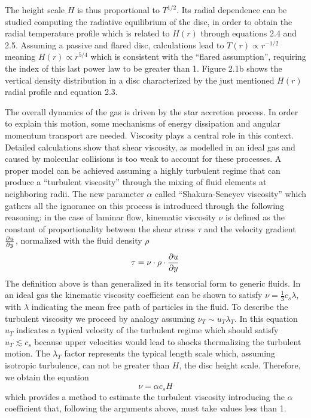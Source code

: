 \documentclass[a4paper,10pt]{report}
\begin{document}
The height scale $H$ is thus proportional to $T^{1/2}$. Its radial dependence
can be studied computing the radiative equilibrium of the disc, in order to obtain the 
radial temperature profile which is related to $H(r)$ through equations 2.4 and 2.5.
Assuming a passive and flared disc, calculations lead to $T(r) \propto r^{-1/2}$ 
meaning $H(r) \propto r^{5/4}$ which is consistent with the ``flared assumption'', requiring the index of this last
power law to be greater than 1.
Figure 2.1b shows the vertical density distribution in a disc characterized by the just mentioned $H(r)$ radial profile
and equation 2.3.

The overall dynamics of the gas is driven by the star accretion process. In order to explain this motion, some mechanisms of energy dissipation and angular momentum transport
are needed. Viscosity plays a central role in this context. Detailed calculations show that shear viscosity, 
as modelled in an ideal gas and caused by molecular collisions is too weak to account for these processes. 
A proper model can be achieved assuming a highly turbulent regime that can produce a ``turbulent viscosity'' through the mixing of fluid elements
at neighboring radii. The new parameter $\alpha$
called ``Shakura-Seneyev viscosity'' which gathers all the ignorance on this process is introduced through the following reasoning:
in the case of laminar flow, kinematic viscosity $\nu$ is defined as the constant of 
proportionality between the shear stress $\tau$ and the velocity gradient  $\pdv{u}{y}$, normalized with the fluid density $\rho$
\begin{equation}
    \tau = \nu \cdot \rho \cdot \pdv{u}{y}
\end{equation}
The definition above is than generalized in its tensorial form to generic fluids.
In an ideal gas the kinematic viscosity coefficient can be shown to satisfy $\nu = \frac{1}{3}c_s\lambda$,
with $\lambda$ indicating the mean free path of particles in the fluid.
To describe the turbulent viscosity we proceed by analogy assuming $\nu_T \sim u_T \lambda_T$. In this equation $u_T$ indicates a typical velocity of the turbulent regime
which should 
satisfy $u_T \lesssim c_s$ because upper velocities would lead to shocks thermalizing the turbulent motion.
The $\lambda_T$ factor 
represents the typical length scale which, assuming isotropic turbulence, can not be greater than $H$, the disc height scale.
Therefore, we obtain the equation
\begin{equation}
    \nu = \alpha c_s H
\end{equation}
which provides a method to estimate the turbulent viscosity introducing the $\alpha$ coefficient that, following the arguments above,
must take values less than 1.
\end{document}

